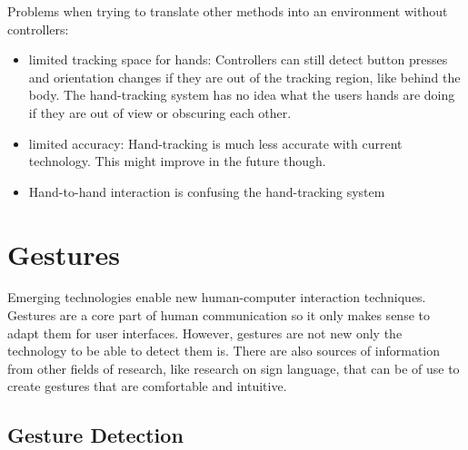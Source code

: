 
Problems when trying to translate other methods into an environment without controllers:

\begin{itemize}
\item
  limited tracking space for hands: Controllers can still detect button
  presses and orientation changes if they are out of the tracking
  region, like behind the body. The hand-tracking system has no idea
  what the users hands are doing if they are out of view or obscuring
  each other.\\
\item
  limited accuracy: Hand-tracking is much less accurate with current
  technology. This might improve in the future though.\\
\item
  Hand-to-hand interaction is confusing the hand-tracking system\\
\end{itemize}

\section{Gestures}\label{gestures}

Emerging technologies enable new human-computer interaction techniques. Gestures are a core part of human communication so it only makes sense to adapt them for user interfaces. However, gestures are not new only the technology to be able to detect them is. There are also sources of information from other fields of research, like research on sign language, that can be of use to create gestures that are comfortable and intuitive.


\subsection{Gesture Detection}\label{gesture-detection}

